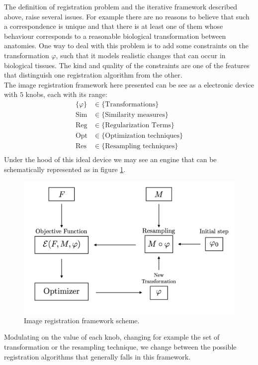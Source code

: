 The definition of registration problem and the iterative framework described above, raise several issues. For example there are no reasons to believe that such a correspondence is unique and that there is at least one of them whose behaviour corresponds to a reasonable biological transformation between anatomies. One way to deal with this problem is to add some constraints on the transformation $\varphi$, such that it models realistic changes that can occur in biological tissues. The kind and quality of the constraints are one of the features that distinguish one registration algorithm from the other. \\
The image registration framework here presented can be see as a electronic device with $5$ knobs, each with its range:
\begin{align*}
\{  \varphi \} &\in \{ \text{Transformations}\}\\
\text{Sim} &\in \{ \text{Similarity measures}\}\\
\text{Reg} &\in \{ \text{Regularization Terms}\}\\
\text{Opt} &\in \{ \text{Optimization techniques}\}\\
\text{Res} &\in \{ \text{Resampling techniques}\}\\
\end{align*}
Under the hood of this ideal device we may see an engine that can be schematically represented as in figure \ref{fig:iterative_algorithm_scheme}.
\begin{figure}[!ht]
	\centering
	\includegraphics[scale=0.235]{figures/iterative_algorithm.png}
	\caption{Image registration framework scheme.}
	\label{fig:iterative_algorithm_scheme}
\end{figure}

\noindent
Modulating on the value of each knob, changing for example the set of transformation or the resampling technique, we change between the possible registration algorithms that generally falls in this framework.\\

